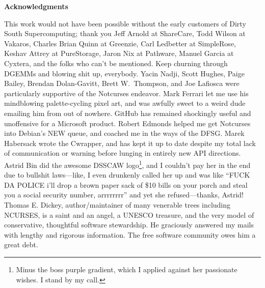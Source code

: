 \documentclass[letterpaper,10pt]{article}
\newcommand\CC{C\nolinebreak\hspace{-.05em}\raisebox{.4ex}{\relsize{-3}{\textbf{+}}}\nolinebreak\hspace{-.10em}\raisebox{.4ex}{\relsize{-3}{\textbf{+}}}\hspace{.2em}}
\begin{document}
\cleardoublepage
\glsaddallunused
\printglossary[title={Glossary of terms}]
\cleardoublepage
\printbibliography
\cleardoublepage
\vspace*{1in}
\begin{center}\textbf{Acknowledgments}\end{center}

This work would not have been possible without the early customers of
Dirty South Supercomputing; thank you Jeff Arnold at ShareCare,
Todd Wilson at Vakaros, Charles Brian Quinn at Greenzie, Carl Ledbetter
at SimpleRose, Keshav Attrey at PureStorage, Jaron Nix at Pathware,
Manuel Garcia at Cyxtera, and the folks who can't be mentioned. Keep
churning through DGEMMs and blowing shit up, everybody. Yacin Nadji,
Scott Hughes, Paige Bailey, Brendan Dolan-Gavitt, Brett W.\ Thompson, and Joe
Lafiosca were particularly supportive of the Notcurses endeavor. Mark Ferrari
let me use his mindblowing palette-cycling pixel art, and was awfully sweet to
a weird dude emailing him from out of nowhere. GitHub has remained shockingly
useful and unoffensive for a Microsoft product. Robert Edmonds helped me get
Notcurses into Debian's NEW queue, and coached me in the ways of the DFSG.
Marek Habersack wrote the \CC wrapper, and has kept it up to date despite my
total lack of communication or warning before lunging in entirely new API
directions. Astrid Bin did the awesome DSSCAW logo\footnote{Minus the boss
  purple gradient, which I applied against her passionate wishes. I stand by my
  call.}, and I couldn't pay her in the end due to bullshit laws---like, I even
drunkenly called her up and was like ``FUCK DA POLICE i'll drop a brown paper
sack of \$10 bills on your porch and steal you a social security number,
arrrrrrrr'' and yet she refused---thanks, Astrid! Thomas E. Dickey,
author/maintainer of many venerable trees including NCURSES, is a saint and an
angel, a UNESCO treasure, and the very model of conservative, thoughtful
software stewardship. He graciously answered my mails with lengthy and rigorous
information. The free software community owes him a great debt.
\end{document}
